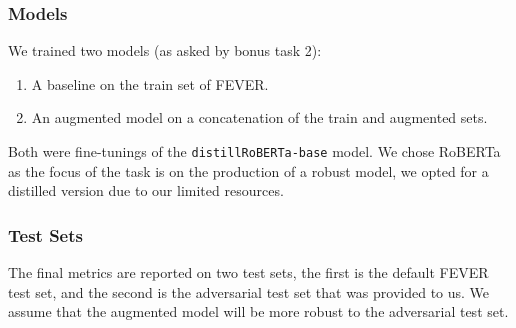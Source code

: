 \documentclass[english, xcolor={table,usenames}]{beamer}
\begin{document}
\begin{frame}
  \frametitle{Models}

  We trained two models (as asked by bonus task 2):

  \begin{enumerate}
    \item A \alert{baseline} on the train set of FEVER.
    \item An \alert{augmented} model on a concatenation of the train and augmented sets.
  \end{enumerate}

  Both were fine-tunings of the \texttt{distillRoBERTa-base} model. We chose RoBERTa as
  the focus of the task is on the production of a robust model, we opted for a distilled
  version due to our limited resources.

\end{frame}

\begin{frame}
  \frametitle{Test Sets}

  The final metrics are reported on \alert{two} test sets, the first is the default
  FEVER test set, and the second is the \alert{adversarial} test set that was provided
  to us. We assume that the augmented model will be more \alert{robust} to the adversarial
  test set.

\end{frame}
\end{document}

